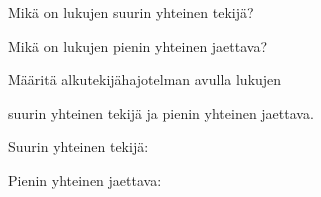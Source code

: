 \begin{tehtava}
    Mikä on lukujen suurin yhteinen tekijä?
    \begin{alakohdat}
    \end{alakohdat}

    \begin{vastaus}
        \begin{alakohdat}
        \end{alakohdat}
    \end{vastaus}
    
\end{tehtava}

\begin{tehtava}
    Mikä on lukujen pienin yhteinen jaettava?
    
    \begin{alakohdat}
    \end{alakohdat}

    \begin{vastaus}
    
        \begin{alakohdat}
        \end{alakohdat}
    \end{vastaus}
    
\end{tehtava}

\begin{tehtava}
    Määritä alkutekijähajotelman avulla lukujen
    \begin{alakohdat}
    \end{alakohdat}
    suurin yhteinen tekijä ja pienin yhteinen jaettava.

    \begin{vastaus}
        Suurin yhteinen tekijä:
        \begin{alakohdatrivi}
        \end{alakohdatrivi}

        Pienin yhteinen jaettava:
        \begin{alakohdat}
        \end{alakohdat}
    \end{vastaus}
    
\end{tehtava}

